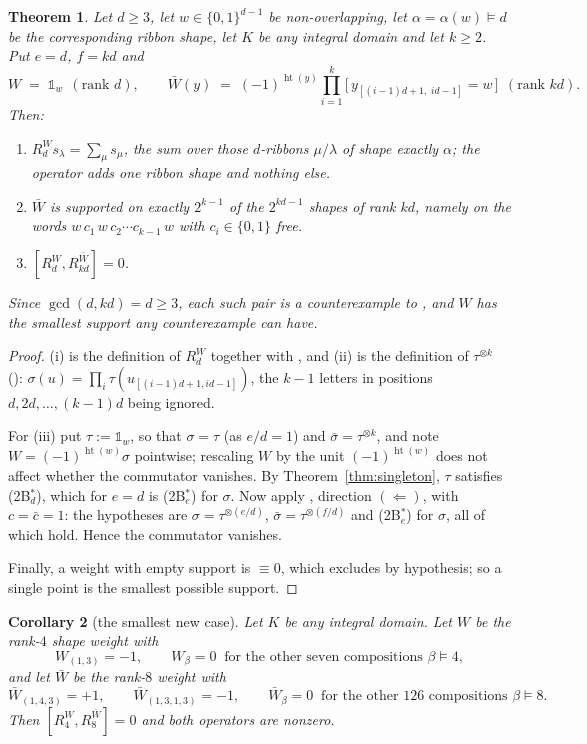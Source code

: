 \documentclass[11pt]{article}
\newtheorem{theorem}{Theorem}[section]
\newtheorem{corollary}[theorem]{Corollary}
\theoremstyle{definition}
\theoremstyle{remark}
\newcommand{\hgt}{\operatorname{ht}}
\newcommand{\one}{\mathbb{1}}
\newcommand{\cube}{\{0,1\}}
\begin{document}
\begin{theorem}\label{thm:main}
Let $d\ge3$, let $w\in\cube^{d-1}$ be non-overlapping, let $\alpha=\alpha(w)\models d$ be the
corresponding ribbon shape, let $K$ be any integral domain and let $k\ge2$.  Put $e=d$,
$f=kd$ and
\[
   W \;=\; \one_{w}\ \ (\text{rank }d),\qquad
   \bar W(y)\;=\;(-1)^{\hgt(y)}\prod_{i=1}^{k}
      \bigl[\,y_{[(i-1)d+1,\;id-1]}=w\,\bigr]\ \ (\text{rank } kd).
\]
Then:
\begin{enumerate}
\item[\textup{(i)}] $R_d^{W}s_\lambda=\sum_\mu s_\mu$, the sum over those $d$-ribbons
  $\mu/\lambda$ of shape exactly $\alpha$; the operator adds one ribbon shape and nothing else.
\item[\textup{(ii)}] $\bar W$ is supported on exactly $2^{k-1}$ of the $2^{kd-1}$ shapes of rank
  $kd$, namely on the words $w\,c_1\,w\,c_2\cdots c_{k-1}\,w$ with $c_i\in\cube$ free.
\item[\textup{(iii)}] $[R_d^{W},R_{kd}^{\bar W}]=0$.
\end{enumerate}
Since $\gcd(d,kd)=d\ge3$, each such pair is a counterexample to \cite[Lemma 8.2]{Q149}, and
$W$ has the smallest support any counterexample can have.
\end{theorem}

\begin{proof}
(i) is the definition of $R_d^{W}$ together with \cite[Lemma 1.3]{Q149}, and (ii) is the
definition of $\tau^{\otimes k}$ (\cite[Conv.~1.1]{Q150c1}): $\sigma(u)=\prod_i
\tau(u_{[(i-1)d+1,id-1]})$, the $k-1$ letters in positions $d,2d,\dots,(k-1)d$ being ignored.

For (iii) put $\tau:=\one_w$, so that $\sigma=\tau$ (as $e/d=1$) and $\bar\sigma=\tau^{\otimes k}$,
and note $W=(-1)^{\hgt(w)}\sigma$ pointwise; rescaling $W$ by the unit $(-1)^{\hgt(w)}$ does not
affect whether the commutator vanishes.  By Theorem~\ref{thm:singleton}, $\tau$ satisfies
(2B$^*_d$), which for $e=d$ is (2B$^*_e$) for $\sigma$.  Now apply
\cite[Thm.~1.3]{Q150c1}, direction $(\Leftarrow)$, with $c=\bar c=1$: the hypotheses are
$\sigma=\tau^{\otimes(e/d)}$, $\bar\sigma=\tau^{\otimes(f/d)}$ and (2B$^*_e$) for $\sigma$, all
of which hold.  Hence the commutator vanishes.

Finally, a weight with empty support is $\equiv0$, which \cite[Lemma 8.2]{Q149} excludes by
hypothesis; so a single point is the smallest possible support.
\end{proof}

\begin{corollary}[the smallest new case]\label{cor:48}
Let $K$ be any integral domain.  Let $W$ be the rank-$4$ shape weight with
\[
  W_{(1,3)}=-1,\qquad W_\beta=0\ \text{ for the other seven compositions }\beta\models4,
\]
and let $\bar W$ be the rank-$8$ weight with
\[
  \bar W_{(1,4,3)}=+1,\qquad \bar W_{(1,3,1,3)}=-1,\qquad \bar W_\beta=0\ \text{ for the other }
  126\text{ compositions }\beta\models8 .
\]
Then $[R_4^{W},R_8^{\bar W}]=0$ and both operators are nonzero.
\end{corollary}
\end{document}

